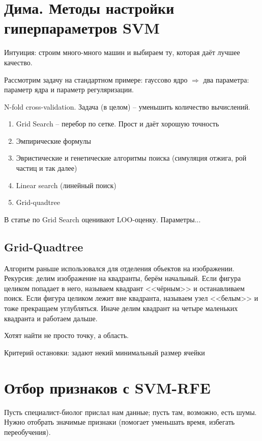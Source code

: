 \documentclass[main.tex]{subfiles}
\begin{document}
\section{Дима. Методы настройки гиперпараметров SVM}

Интуиция: строим много-много машин и выбираем ту, которая даёт лучшее качество.

Рассмотрим задачу на стандартном примере: гауссово ядро $ \Rightarrow $ два параметра: параметр ядра и параметр регуляризации.

N-fold cross-validation.
Задача (в целом) -- уменьшить количество вычислений.

\begin{enumerate}[noitemsep]
	\item Grid Search -- перебор по сетке. Прост и даёт хорошую точность
	\item Эмпирические формулы
	\item Эвристические и генетические алгоритмы поиска (симуляция отжига, рой частиц и так далее)
	\item Linear search (линейный поиск)
	\item Grid-quadtree
\end{enumerate}

В статье по Grid Search оценивают LOO-оценку.
Параметры...

\subsection{Grid-Quadtree}

Алгоритм раньше использовался для отделения объектов на изображении.
Рекурсия: делим изображение на квадранты, берём начальный.
Если фигура целиком попадает в него, называем квадрант <<чёрным>> и останавливаем поиск.
Если фигура целиком лежит вне квадранта, называем узел <<белым>> и тоже прекращаем углубляться.
Иначе делим квадрант на четыре маленьких квадранта и работаем дальше.

Хотят найти не просто точку, а область.

Критерий остановки: задают некий минимальный размер ячейки

\section{Отбор признаков с SVM-RFE}

Пусть специалист-биолог прислал нам данные; пусть там, возможно, есть шумы.
Нужно отобрать значимые признаки (помогает уменьшать время, избегать переобучения).
\end{document}
